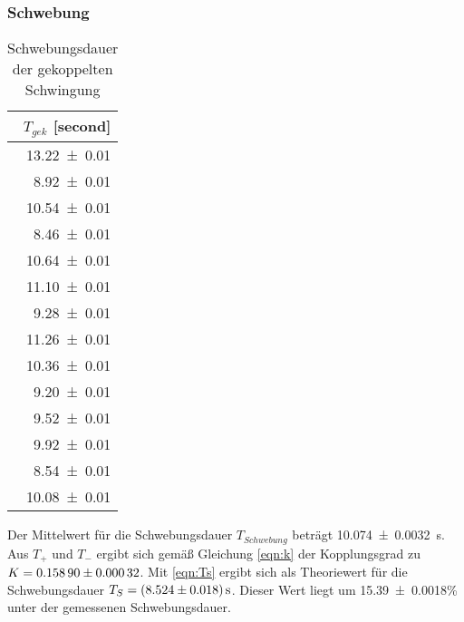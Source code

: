 \subsubsection{Schwebung}
\begin{table}[H]
 \centering
 \caption{Schwebungsdauer der gekoppelten
 Schwingung}
 \label{tab:l2tschwebung}
 \begin{tabular}{r}
 \toprule
  {$T_{gek}$ [\si{second}]} \\
 \midrule
    \num{13.22 +- 0.01}\\
    \num{8.92 +- 0.01}\\
    \num{10.54 +- 0.01}\\
    \num{8.46 +- 0.01}\\
    \num{10.64 +- 0.01}\\
    \num{11.10 +- 0.01}\\
    \num{9.28 +- 0.01}\\
    \num{11.26 +- 0.01}\\
    \num{10.36 +- 0.01}\\
    \num{9.20 +- 0.01}\\
    \num{9.52 +- 0.01}\\
    \num{9.92 +- 0.01}\\
    \num{8.54 +- 0.01}\\
    \num{10.08 +- 0.01}\\
 \bottomrule
 \end{tabular}
\end{table}

Der Mittelwert für die Schwebungsdauer $T_{Schwebung}$
beträgt \SI{10.074 +-0.0032}{\second}.
Aus $T_+$ und $T_-$ ergibt sich gemäß Gleichung \ref{eqn:k} der Kopplungsgrad zu
$K = \num{0.1589 +- 0.00032}$. Mit \ref{eqn:Ts} ergibt sich als Theoriewert
für die Schwebungsdauer $T_S = \SI{8.524 +- 0.018}{\second}$. Dieser Wert liegt
um \num{15.39+-0.0018}\% unter der gemessenen Schwebungsdauer.
